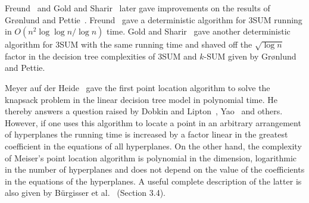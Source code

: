 Freund~\cite{F15} and Gold and Sharir~\cite{GS15} later gave improvements on the
results of Gr{\o}nlund and Pettie~\cite{GP14}. Freund~\cite{F15} gave a deterministic algorithm for
3SUM running in \(O( {n^2\log \log n}/{\log n})\) time.
Gold and Sharir~\cite{GS15} gave another deterministic algorithm for 3SUM
with the same running time and shaved off the $\sqrt{\log n}$ factor in the
decision tree complexities of 3SUM and \(k\)-SUM given by Gr{\o}nlund and Pettie.

Meyer auf der Heide~\cite{M84} gave the first point location algorithm to solve the knapsack
problem in the linear decision tree model in polynomial time. He thereby
answers a question raised by Dobkin and Lipton~\cite{DL74,DL78}, Yao~\cite{Y82}
and others. However, if one uses this algorithm to locate a point in an
arbitrary arrangement of hyperplanes the running time is increased by a factor
linear in the greatest coefficient in the equations of all hyperplanes.
On the other hand, the complexity of Meiser's point location algorithm is
polynomial in the dimension, logarithmic in the number of hyperplanes and
does not depend on the value of the coefficients in the equations of the
hyperplanes. A useful complete description of the latter is also given by
Bürgisser et al.~\cite{B97} (Section 3.4).

